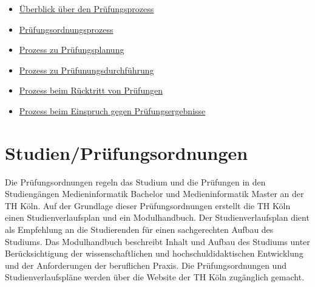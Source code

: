 \begin{itemize}
\tightlist
\item
  \href{https://th-koeln.github.io/mi-2017/anhaenge/Prozessbeschreibung_PruefungsprozessUeberblick.pdf}{Überblick
  über den Prüfungsprozess}
\item
  \href{https://th-koeln.github.io/mi-2017/anhaenge/Prozessbeschreibung_Pruefungsordnungsprozess.pdf}{Prüfungsordnungsprozess}
\item
  \href{https://th-koeln.github.io/mi-2017/anhaenge/Prozessbeschreibung_Pruefungplanung.pdf}{Prozess zu
  Prüfungsplanung}
\item
  \href{https://th-koeln.github.io/mi-2017/anhaenge/Prozessbeschreibung_Pruefungdurchfuehren.pdf}{Prozess
  zu Prüfunungsdurchführung}
\item
  \href{https://th-koeln.github.io/mi-2017/anhaenge/Prozessbeschreibung_vonPruefungzuruecktreten.pdf}{Prozess
  beim Rücktritt von Prüfungen}
\item
  \href{https://th-koeln.github.io/mi-2017/anhaenge/Prozessbeschreibung_EinspruchPruefungsergebnisse.pdf}{Prozess
  beim Einspruch gegen Prüfungsergebnisse}
\end{itemize}

\section{Studien/Prüfungsordnungen\label{/mi-2017/selbstbericht/0600-pruefungssystem/0000-pruefungssystem}}\label{studienpruxfcfungsordnungenpathlabelmi-2017selbstbericht0600-pruefungssystem0000-pruefungssystem}

Die Prüfungsordnungen regeln das Studium und die Prüfungen in den
Studiengängen Medieninformatik Bachelor und Medieninformatik Master an
der TH Köln. Auf der Grundlage dieser Prüfungsordnungen erstellt die TH
Köln einen Studienverlaufsplan und ein Modulhandbuch. Der
Studienverlaufsplan dient als Empfehlung an die Studierenden für einen
sachgerechten Aufbau des Studiums. Das Modulhandbuch beschreibt Inhalt
und Aufbau des Studiums unter Berücksichtigung der wissenschaftlichen
und hochschuldidaktischen Entwicklung und der Anforderungen der
beruflichen Praxis. Die Prüfungsordnungen und Studienverlaufspläne
werden über die Website der TH Köln zugänglich gemacht.

